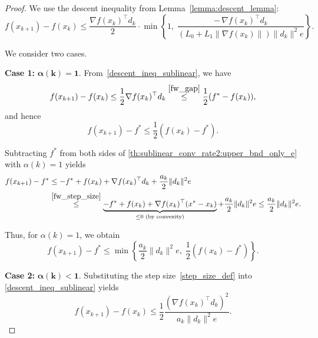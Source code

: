 \documentclass[10pt,a4paper]{amsart}
\begin{document}
	\begin{proof}
		We use the descent inequality from Lemma~\ref{lemma:descent_lemma}:
		\begin{equation}\label{descent_ineq_sublinear}
			f(x_{k+1}) - f(x_k)
			\leq
			\frac{\nabla f(x_k)^\top d_k}{2}
			\cdot
			\min \left\{
			1,\;
			\frac{-\, \nabla f(x_k)^\top d_k}{
				\left(L_0 + L_1 \|\nabla f(x_k)\|\right)
				\|d_k\|^2 e}
			\right\}.
		\end{equation}
		
		We consider two cases.
		
		\medskip
		\noindent
		\textbf{Case 1:} $\boldsymbol{\alpha(k) = 1.}$  
		From~\eqref{descent_ineq_sublinear}, we have
		\begin{equation*}
			f(x_{k+1}) - f(x_k)
			\leq
			\frac{1}{2} \nabla f(x_k)^\top d_k
			\overset{\eqref{fw_gap}}{\leq}
			\frac{1}{2} (f^* - f(x_k)),
		\end{equation*}
		and hence
		\begin{equation*}
			f(x_{k+1}) - f^* \leq \frac{1}{2} (f(x_k) - f^*).
		\end{equation*}
		
		Subtracting $f^*$ from both sides of
		\eqref{th:sublinear_conv_rate2:upper_bnd_only_e} with $\alpha(k)=1$ yields
		\begin{equation*}
			\begin{split}
				f(x_{k+1}) - f^*
				&\leq -f^* + f(x_k) + \nabla f(x_k)^\top d_k
				+ \frac{a_k}{2} \|d_k\|^2 e \\
				&\overset{\eqref{fw_step_size}}{\leq}
				\underbrace{-f^* + f(x_k)
					+ \nabla f(x_k)^\top (x^* - x_k)}_{\leq 0 \text{ (by convexity)}}
				+ \frac{a_k}{2} \|d_k\|^2 e
				\leq \frac{a_k}{2} \|d_k\|^2 e.
			\end{split}
		\end{equation*}
		
		Thus, for $\alpha(k) = 1$, we obtain
		\begin{equation}\label{alpha_1_case_desc_ineq}
			f(x_{k+1}) - f^* \leq
			\min \left\{
			\frac{a_k}{2} \|d_k\|^2 e,\;
			\frac{1}{2}(f(x_k) - f^*)
			\right\}.
		\end{equation}
		
		\medskip
		\noindent
		\textbf{Case 2:} $\boldsymbol{\alpha(k) < 1.}$  
		Substituting the step size~\eqref{step_size_def} into
		\eqref{descent_ineq_sublinear} yields
		\begin{equation}\label{descent_ineq_alg_2_step_size_less_1}
			f(x_{k+1}) - f(x_k)
			\leq
			\frac{1}{2}
			\frac{(\nabla f(x_k)^\top d_k)^2}{
				a_k \|d_k\|^2 e}.
		\end{equation}
		

\end{proof}
\end{document}
